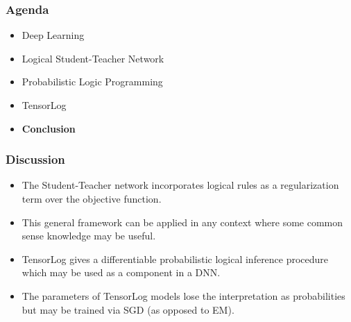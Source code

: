 \documentclass{beamer}
\begin{document}
\begin{frame}
\frametitle{Agenda}
\begin{itemize}
	\item Deep Learning
	\item Logical Student-Teacher Network
	\item Probabilistic Logic Programming
	\item TensorLog
	\item \textbf{Conclusion}
\end{itemize}
\end{frame}

\begin{frame}[fragile]
\frametitle{Discussion}
\begin{itemize}
	\item The Student-Teacher network incorporates logical rules as a regularization term over the objective function.
	\item This general framework can be applied in any context where some common sense knowledge may be useful.
	\item TensorLog gives a differentiable probabilistic logical inference procedure which may be used as a component in a DNN.
	\item The parameters of TensorLog models lose the interpretation as probabilities but may be trained via SGD (as opposed to EM).
\end{itemize}
\end{frame}
\end{document}
